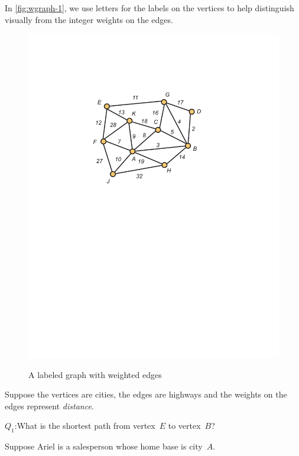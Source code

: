 \begin{example}
In \autoref{fig:wgraph-1}, we use letters for the labels on the
vertices to help distinguish visually from the integer weights
on the edges. 

\begin{figure}
\begin{center}
\includegraphics[viewport=140 413 430 650, scale=.6]{intro-figs/3012-fig12}\\
\end{center}
\caption{A labeled graph with weighted edges}
\label{fig:wgraph-1}
\end{figure}

Suppose the vertices are cities, the edges are highways
and the weights on the edges represent \textit{distance}.

\medskip
\noindent
$Q_1$:\quad  What is the shortest path from vertex~$E$ to vertex~$B$?

\medskip
Suppose Ariel is a salesperson whose home base is city~$A$. 


\end{example}

